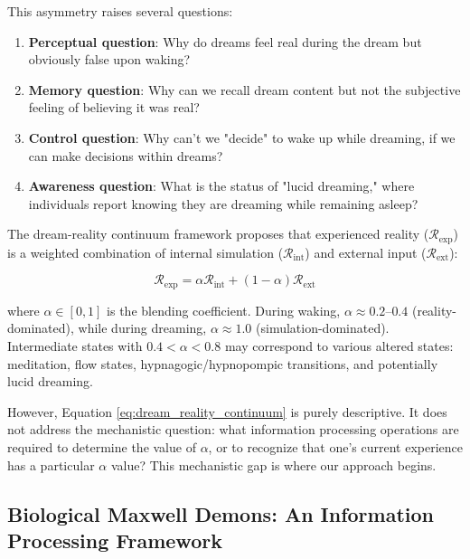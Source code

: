 \documentclass[11pt,a4paper]{article}
\begin{document}
This asymmetry raises several questions:

\begin{enumerate}
\item \textbf{Perceptual question}: Why do dreams feel real during the dream but obviously false upon waking?

\item \textbf{Memory question}: Why can we recall dream content but not the subjective feeling of believing it was real?

\item \textbf{Control question}: Why can't we "decide" to wake up while dreaming, if we can make decisions within dreams?

\item \textbf{Awareness question}: What is the status of "lucid dreaming," where individuals report knowing they are dreaming while remaining asleep?
\end{enumerate}

The dream-reality continuum framework proposes that experienced reality ($\mathcal{R}_{\text{exp}}$) is a weighted combination of internal simulation ($\mathcal{R}_{\text{int}}$) and external input ($\mathcal{R}_{\text{ext}}$):

\begin{equation}
\mathcal{R}_{\text{exp}} = \alpha \mathcal{R}_{\text{int}} + (1-\alpha) \mathcal{R}_{\text{ext}}
\label{eq:dream_reality_continuum}
\end{equation}

where $\alpha \in [0,1]$ is the blending coefficient. During waking, $\alpha \approx 0.2$–$0.4$ (reality-dominated), while during dreaming, $\alpha \approx 1.0$ (simulation-dominated). Intermediate states with $0.4 < \alpha < 0.8$ may correspond to various altered states: meditation, flow states, hypnagogic/hypnopompic transitions, and potentially lucid dreaming.

However, Equation \ref{eq:dream_reality_continuum} is purely descriptive. It does not address the mechanistic question: what information processing operations are required to determine the value of $\alpha$, or to recognize that one's current experience has a particular $\alpha$ value? This mechanistic gap is where our approach begins.

\subsection{Biological Maxwell Demons: An Information Processing Framework}
\end{document}
